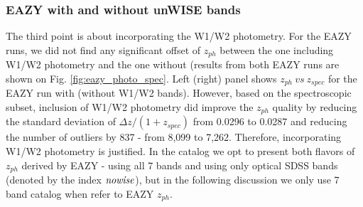 \documentclass[apj,iop]{emulateapj}
\begin{document}

\subsubsection{EAZY with and without unWISE bands}


The third point is about incorporating the W1/W2 photometry. For the EAZY runs, we did not find any significant offset of $z_{ph}$ between the one including W1/W2 photometry and the one without (results from both EAZY runs are shown on Fig. \ref{fig:eazy_photo_spec}. Left (right) panel shows $z_{ph}\ vs\ z_{spec}$ for the EAZY run with (without W1/W2 bands). However, based on the spectroscopic subset, inclusion of W1/W2 photometry did improve the $z_{ph}$ quality by reducing the standard deviation of $\Delta z/(1+z_{spec})$ from 0.0296 to 0.0287 and reducing the number of outliers by 837 - from 8,099 to 7,262. Therefore, incorporating W1/W2 photometry is justified. In the catalog we opt to present both flavors of $z_{ph}$ derived by EAZY - using all 7 bands and using only optical SDSS bands (denoted by the index $\it{nowise}$), but in the following discussion we only use 7 band catalog  when refer to EAZY $z_{ph}$.
\end{document}

